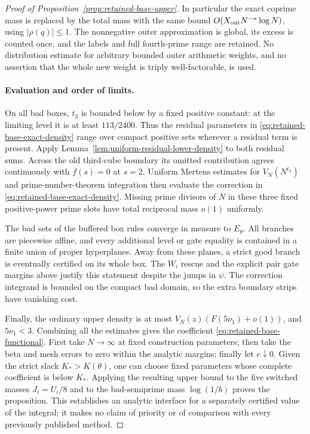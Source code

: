 \documentclass[11pt]{article}
\begin{document}
\begin{proof}[Proof of Proposition~\ref{prop:retained-base-upper}]
In particular the exact coprime mass is replaced by the total mass
with the same bound
$O(X_{\rm out}N^{-a}\log N)$, using $|\rho(q)|\le1$.
The nonnegative outer approximation is global, its excess is counted
once, and the labels and full fourth-prime range are retained.
No distribution estimate for arbitrary bounded outer arithmetic
weights, and no assertion that the whole new weight is triply
well-factorable, is used.

\paragraph{Evaluation and order of limits.}
On all bad boxes, $t_3$ is bounded below by a fixed positive constant:
at the limiting level it is at least $113/2400$. Thus the residual
parameters in \eqref{eq:retained-base-exact-density} range over
compact positive sets wherever a residual term is present. Apply
Lemma~\ref{lem:uniform-residual-lower-density} to both residual sums.
Across the old third-cube boundary its omitted contribution agrees
continuously with $f(s)=0$ at $s=2$.
Uniform Mertens estimates for $V_N(N^{t_3})$ and prime-number-theorem
integration then evaluate the correction in
\eqref{eq:retained-base-exact-density}. Missing prime divisors of
$N$ in these three fixed positive-power prime slots have total
reciprocal mass $o(1)$ uniformly.

The bad sets of the buffered box rules converge in measure to
$E_\theta$. All branches are piecewise affine, and every additional
level or gate equality is contained in a finite union of proper
hyperplanes. Away from these planes, a strict good branch is
eventually certified on its whole box. The $W_i$ rescue and the
explicit pair gate margins above justify this statement despite
the jumps in $\psi$. The correction integrand is bounded on the
compact bad domain, so the extra boundary strips have vanishing cost.

Finally, the ordinary upper density is at most
$V_N(z)(F(5\nu_1)+o(1))$, and $5\nu_1<3$.
Combining all the estimates gives the coefficient
\eqref{eq:retained-base-functional}. First take $N\to\infty$ at
fixed construction parameters; then take the beta and mesh errors
to zero within the analytic margins; finally let $e\downarrow0$.
Given the strict slack $K_*>K(\theta)$, one can choose fixed
parameters whose complete coefficient is below $K_*$.
Applying the resulting upper bound to the five switched masses
$J_i=U_i/8$ and to the bad-semiprime mass $\log(1/b)$ proves
the proposition. This establishes an analytic interface for a
separately certified value of the integral; it makes no claim of
priority or of comparison with every previously published method.
\end{proof}
\end{document}
